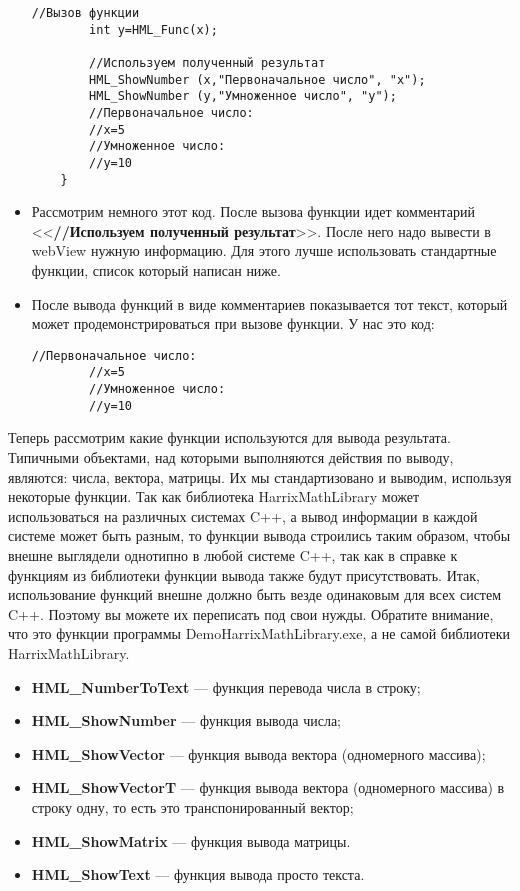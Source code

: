\begin{itemize}
\begin{lstlisting}[label=examplefunction08, caption=Добавление демонстрации работы функции на примере]
        //Вызов функции
        int y=HML_Func(x);

        //Используем полученный результат
        HML_ShowNumber (x,"Первоначальное число", "x");
        HML_ShowNumber (y,"Умноженное число", "y");
        //Первоначальное число:
        //x=5
        //Умноженное число:
        //y=10
    }
\end{lstlisting}
\item Рассмотрим немного этот код. После вызова функции идет комментарий <<\textbf{//Используем полученный результат}>>. После него надо вывести в webView нужную информацию. Для этого лучше использовать стандартные функции, список который написан ниже.
\item  После вывода функций в виде комментариев показывается тот текст, который может продемонстрироваться при вызове функции. У нас это код:
\begin{lstlisting}[label=examplefunction09, caption=Закомментированный результат работы функции]
        //Первоначальное число:
        //x=5
        //Умноженное число:
        //y=10
\end{lstlisting}
\end{itemize}

Теперь рассмотрим какие функции используются для вывода результата. Типичными объектами, над которыми выполняются действия по выводу, являются: числа, вектора, матрицы. Их мы стандартизовано и выводим, используя некоторые функции. Так как библиотека HarrixMathLibrary может использоваться на различных системах C++, а вывод информации в каждой системе может быть разным, то функции вывода строились таким образом, чтобы внешне выглядели однотипно в любой системе C++, так как в справке к функциям из библиотеки функции вывода также будут присутствовать. Итак, использование функций внешне должно быть везде одинаковым для всех систем C++.  Поэтому вы можете их переписать под свои нужды. Обратите внимание, что это функции программы DemoHarrixMathLibrary.exe, а не самой библиотеки HarrixMathLibrary.

\begin{itemize}
\item \textbf{HML\_NumberToText} --- функция перевода числа в строку; 
\item \textbf{HML\_ShowNumber} --- функция вывода числа;
\item \textbf{HML\_ShowVector} --- функция вывода вектора (одномерного массива);
\item \textbf{HML\_ShowVectorT} --- функция вывода вектора (одномерного массива) в строку одну, то есть это транспонированный вектор;
\item \textbf{HML\_ShowMatrix} --- функция вывода матрицы.
\item \textbf{HML\_ShowText} --- функция вывода просто текста.
\end{itemize}

